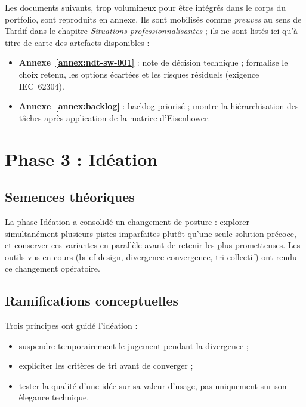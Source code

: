 Les documents suivants, trop volumineux pour être intégrés dans le corps du portfolio, sont reproduits en annexe. Ils sont mobilisés comme \emph{preuves} au sens de Tardif dans le chapitre \textit{Situations professionnalisantes} ; ils ne sont listés ici qu'à titre de carte des artefacts disponibles :

\begin{itemize}
  \item \textbf{Annexe~\ref{annex:ndt-sw-001}} : note de décision technique ; formalise le choix retenu, les options écartées et les risques résiduels (exigence IEC~62304).
  \item \textbf{Annexe~\ref{annex:backlog}} : backlog priorisé ; montre la hiérarchisation des tâches après application de la matrice d'Eisenhower.
\end{itemize}

\section{Phase 3 : Idéation}


\subsection{Semences théoriques}

La phase Idéation a consolidé un changement de posture : explorer simultanément plusieurs pistes imparfaites plutôt qu'une seule solution précoce, et conserver ces variantes en parallèle avant de retenir les plus prometteuses. Les outils vus en cours (brief design, divergence-convergence, tri collectif) ont rendu ce changement opératoire.

\subsection{Ramifications conceptuelles}

Trois principes ont guidé l'idéation :
\begin{itemize}
  \item suspendre temporairement le jugement pendant la divergence ;
  \item expliciter les critères de tri avant de converger ;
  \item tester la qualité d'une idée sur sa valeur d'usage, pas uniquement sur son èlegance technique.
\end{itemize}

